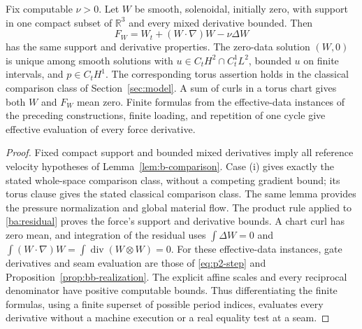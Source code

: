 \begin{lemma}\label{ba:realization}
Fix computable $\nu>0$.  Let $W$ be smooth, solenoidal, initially zero,
with support in one compact subset of $\mathbb R^3$ and every mixed
derivative bounded.  Then
\begin{equation}\label{ba:residual}
 F_W=W_t+(W\cdot\nabla)W-\nu\Delta W
\end{equation}
has the same support and derivative properties.  The zero-data solution
$(W,0)$ is unique among smooth solutions with
$u\in C_tH^2\cap C_t^1L^2$, bounded $u$ on finite intervals, and
$p\in C_tH^1$.  The corresponding torus assertion holds in the
classical comparison class of Section~\ref{sec:model}.  A sum of curls
in a torus chart gives both $W$ and $F_W$ mean zero.  Finite formulas
from the effective-data instances of the preceding constructions, finite
loading, and repetition of one cycle give effective evaluation of every
force derivative.
\end{lemma}
\begin{proof}\label{ba:realization-proof}
Fixed compact support and bounded mixed derivatives imply all reference
velocity hypotheses of Lemma~\ref{lem:b-comparison}.  Case (i) gives
exactly the stated whole-space comparison class, without a competing
gradient bound; its torus clause gives the stated classical comparison
class.  The same lemma provides the pressure normalization and global
material flow.  The product rule applied to \eqref{ba:residual}
proves the force's support and derivative bounds.  A chart curl has
zero mean, and integration of the residual uses
$\int\Delta W=0$ and
$\int(W\cdot\nabla)W=\int\operatorname{div}(W\otimes W)=0$.
For these effective-data instances, gate derivatives and seam evaluation are
those of \eqref{eq:p2-step} and Proposition~\ref{prop:bb-realization}.
The explicit affine scales and every reciprocal denominator have positive
computable bounds.  Thus differentiating the finite formulas, using a
finite superset of possible period indices, evaluates every derivative
without a machine execution or a real equality test at a seam.
\end{proof}
